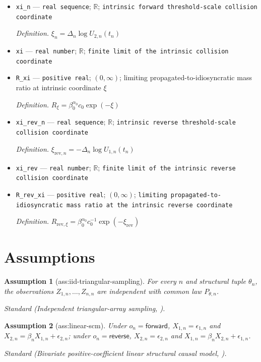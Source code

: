 \documentclass{article}
\newtheorem{assumption}{Assumption}
\begin{document}
\begin{itemize}
  \item \texttt{xi\_\allowbreak{}n} --- \texttt{real sequence}; \(\mathbb R\); \texttt{intrinsic forward threshold-\allowbreak{}scale collision coordinate}
  \par\smallskip\noindent\emph{Definition.} \(\xi_n=\Delta_n\log U_{2,n}(t_n)\)
  \item \texttt{xi} --- \texttt{real number}; \(\mathbb R\); \texttt{finite limit of the intrinsic collision coordinate}
  \item \texttt{R\_\allowbreak{}xi} --- \texttt{positive real}; \((0,\infty)\); limiting propagated-to-idiosyncratic mass ratio at intrinsic coordinate \(\xi\)
  \par\smallskip\noindent\emph{Definition.} \(R_\xi=\beta_0^{\alpha_0}c_0\exp(-\xi)\)
  \item \texttt{xi\_\allowbreak{}rev\_\allowbreak{}n} --- \texttt{real sequence}; \(\mathbb R\); \texttt{intrinsic reverse threshold-\allowbreak{}scale collision coordinate}
  \par\smallskip\noindent\emph{Definition.} \(\xi_{\mathrm{rev},n}=-\Delta_n\log U_{1,n}(t_n)\)
  \item \texttt{xi\_\allowbreak{}rev} --- \texttt{real number}; \(\mathbb R\); \texttt{finite limit of the intrinsic reverse collision coordinate}
  \item \texttt{R\_\allowbreak{}rev\_\allowbreak{}xi} --- \texttt{positive real}; \((0,\infty)\); \texttt{limiting propagated-\allowbreak{}to-\allowbreak{}idiosyncratic mass ratio at the intrinsic reverse coordinate}
  \par\smallskip\noindent\emph{Definition.} \(R_{\mathrm{rev},\xi}=\beta_0^{\alpha_0}c_0^{-1}\exp(-\xi_{\mathrm{rev}})\)
\end{itemize}

\section{Assumptions}

\begin{assumption}[ass:iid-triangular-sampling]\label{ass:iid-triangular-sampling}
For every \(n\) and structural tuple \(\theta_n\), the observations \(Z_{1,n},\ldots,Z_{n,n}\) are independent with common law \(P_{\theta,n}\).
\par\smallskip\noindent\emph{Standard} (Independent triangular-array sampling, \cite{vanDerVaart1998}).
\end{assumption}

\begin{assumption}[ass:linear-scm]\label{ass:linear-scm}
Under \(o_n=\mathsf{forward}\), \(X_{1,n}=\epsilon_{1,n}\) and \(X_{2,n}=\beta_nX_{1,n}+\epsilon_{2,n}\); under \(o_n=\mathsf{reverse}\), \(X_{2,n}=\epsilon_{2,n}\) and \(X_{1,n}=\beta_nX_{2,n}+\epsilon_{1,n}\).
\par\smallskip\noindent\emph{Standard} (Bivariate positive-coefficient linear structural causal model, \cite{GneccoEtAl2021}).
\end{assumption}
\end{document}
